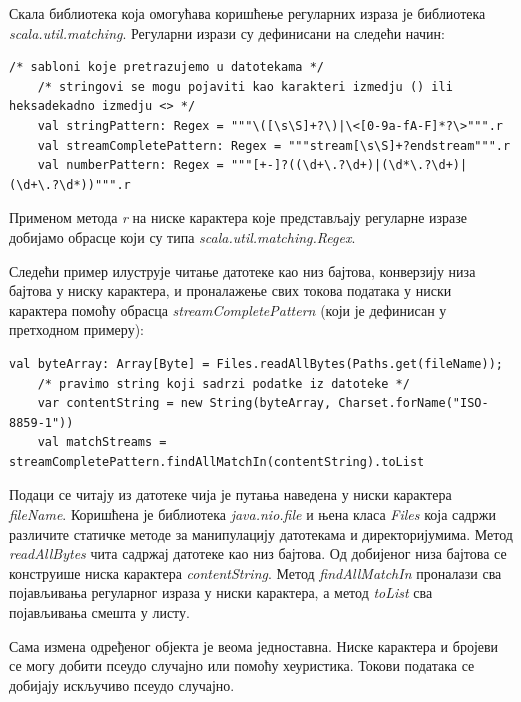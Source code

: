 \documentclass[12pt,oneside]{memoir}
\begin{document}
Скала библиотека која омогућава коришћење регуларних израза је библиотека \textit{scala.util.matching}. Регуларни изрази су дефинисани на следећи начин:

\begin{lstlisting}[frame=single]
    /* sabloni koje pretrazujemo u datotekama */
    /* stringovi se mogu pojaviti kao karakteri izmedju () ili heksadekadno izmedju <> */
    val stringPattern: Regex = """\([\s\S]+?\)|\<[0-9a-fA-F]*?\>""".r
    val streamCompletePattern: Regex = """stream[\s\S]+?endstream""".r
    val numberPattern: Regex = """[+-]?((\d+\.?\d+)|(\d*\.?\d+)|(\d+\.?\d*))""".r
\end{lstlisting}

Применом метода \textit{r} на ниске карактера које представљају регуларне изразе добијамо обрасце који су типа \textit{scala.util.matching.Regex}.

Следећи пример илуструје читање датотеке као низ бајтова, конверзију низа бајтова у ниску карактера, и проналажење свих токова података у ниски карактера помоћу обрасца \textit{streamCompletePattern} (који је дефинисан у претходном примеру):

\begin{lstlisting}[frame=single]
    val byteArray: Array[Byte] = Files.readAllBytes(Paths.get(fileName));
    /* pravimo string koji sadrzi podatke iz datoteke */
    var contentString = new String(byteArray, Charset.forName("ISO-8859-1"))
    val matchStreams = streamCompletePattern.findAllMatchIn(contentString).toList
\end{lstlisting}

Подаци се читају из датотеке чија је путања наведена у ниски карактера \textit{fileName}. Коришћена је библиотека \textit{java.nio.file} и њена класа \textit{Files} која садржи различите статичке методе за манипулацију датотекама и директоријумима. Метод \textit{readAllBytes} чита садржај датотеке као низ бајтова. Од добијеног низа бајтова се конструише ниска карактера \textit{contentString}. Метод \textit{findAllMatchIn} проналази сва појављивања регуларног израза у ниски карактера, а метод \textit{toList} сва појављивања смешта у листу.

Сама измена одређеног објекта је веома једноставна. Ниске карактера и бројеви се могу добити псеудо случајно или помоћу хеуристика. Токови података се добијају искључиво псеудо случајно. 
\end{document}
